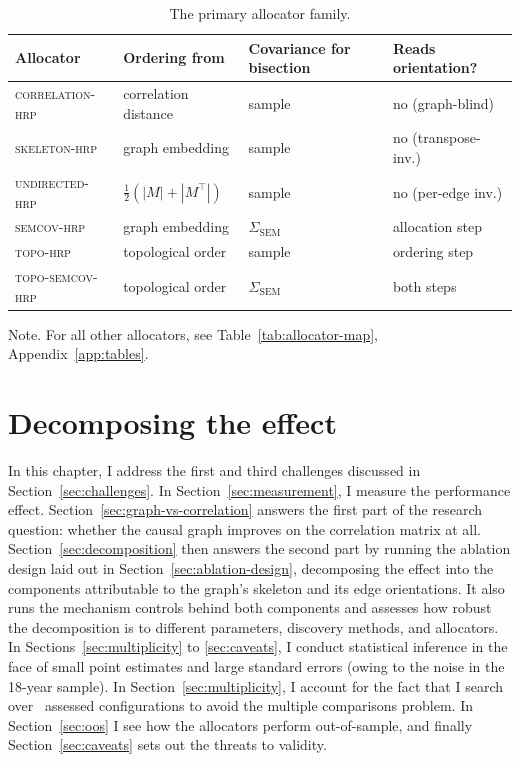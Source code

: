 \documentclass[11pt, a4paper]{report}
\newcommand{\corrhrp}{\textsc{correlation-hrp}}
\newcommand{\skelhrp}{\textsc{skeleton-hrp}}
\newcommand{\undirhrp}{\textsc{undirected-hrp}}
\newcommand{\semcovhrp}{\textsc{semcov-hrp}}
\newcommand{\topohrp}{\textsc{topo-hrp}}
\newcommand{\toposemcovhrp}{\textsc{topo-semcov-hrp}}
\newcommand{\floatnote}[1]{\par\vspace{3pt}\begin{minipage}{0.92\textwidth}\footnotesize Note. #1\end{minipage}\par}
\begin{document}
\begin{table}[t]
  \centering
  \caption{The primary allocator family.}
  \label{tab:variants}
  \small
  \setlength{\tabcolsep}{4.5pt}
  \begin{tabular}{l l l l}
    \toprule
    Allocator & Ordering from & Covariance for bisection & Reads orientation? \\
    \midrule
    \corrhrp{} & correlation distance & sample & no (graph-blind) \\
    \skelhrp{}            & graph embedding      & sample & no (transpose-inv.) \\
    \undirhrp{}           & $\tfrac{1}{2}(|M|{+}|M^\top|)$ & sample & no (per-edge inv.) \\
    \semcovhrp{}            & graph embedding      & $\Sigma_{\mathrm{SEM}}$ & allocation step \\
    \topohrp{}            & topological order    & sample & ordering step \\
    \toposemcovhrp{}           & topological order    & $\Sigma_{\mathrm{SEM}}$ & both steps \\
    \bottomrule
  \end{tabular}
  \floatnote{For all other allocators, see Table~\ref{tab:allocator-map}, Appendix~\ref{app:tables}.}
\end{table}

\chapter{Decomposing the effect}
\label{chap:evaluation}

In this chapter, I address the first and third challenges discussed in Section~\ref{sec:challenges}.
In Section~\ref{sec:measurement}, I measure the performance effect.
Section~\ref{sec:graph-vs-correlation} answers the first part of the research question: whether the causal
graph improves on the correlation matrix at all.
Section~\ref{sec:decomposition} then answers the second part by running the ablation design laid out in Section~\ref{sec:ablation-design}, decomposing the effect into the components attributable to the graph's skeleton and its edge orientations. It also runs the mechanism controls behind both components and assesses how robust the decomposition is to different parameters, discovery methods, and allocators.
In Sections~\ref{sec:multiplicity} to \ref{sec:caveats}, I conduct statistical inference in the face of small point estimates and large standard errors (owing to the noise in the 18-year sample). In Section~\ref{sec:multiplicity}, I account for the fact that I search over \rsNtrials\ assessed configurations to avoid the multiple comparisons problem.
In Section~\ref{sec:oos} I see how the allocators perform out-of-sample, and finally Section~\ref{sec:caveats} sets out the threats to validity.
\end{document}
